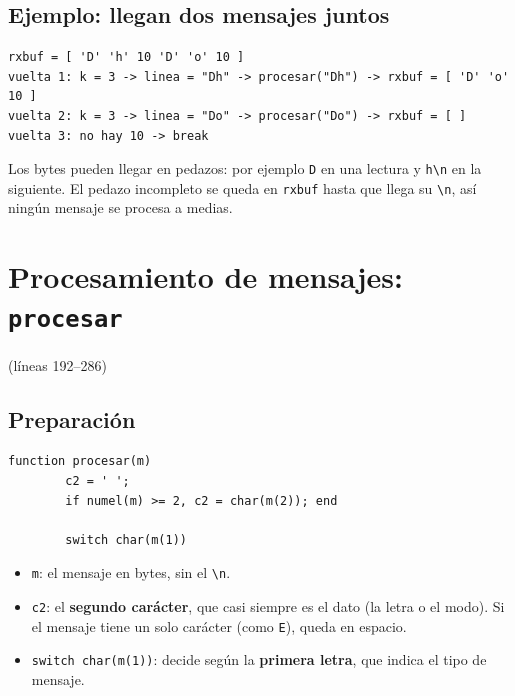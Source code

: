 \documentclass[11pt,a4paper]{article}
\newcommand{\linea}[1]{\textcolor{gris}{\small(líneas #1)}}
\newcommand{\cod}[1]{\texttt{#1}}
\begin{document}
\subsection*{Ejemplo: llegan dos mensajes juntos}
\begin{diagrama}
\begin{verbatim}
rxbuf = [ 'D' 'h' 10 'D' 'o' 10 ]
vuelta 1: k = 3 -> linea = "Dh" -> procesar("Dh") -> rxbuf = [ 'D' 'o' 10 ]
vuelta 2: k = 3 -> linea = "Do" -> procesar("Do") -> rxbuf = [ ]
vuelta 3: no hay 10 -> break
\end{verbatim}
\end{diagrama}

\begin{ojo}
Los bytes pueden llegar en pedazos: por ejemplo \cod{D} en una lectura y
\cod{h\textbackslash n} en la siguiente. El pedazo incompleto se queda en
\cod{rxbuf} hasta que llega su \cod{\textbackslash n}, así ningún mensaje se procesa
a medias.
\end{ojo}

\section{Procesamiento de mensajes: \texttt{procesar}}
\linea{192--286}

\subsection{Preparación}
\begin{lstlisting}[firstnumber=192]
    function procesar(m)
        c2 = ' ';
        if numel(m) >= 2, c2 = char(m(2)); end

        switch char(m(1))
\end{lstlisting}
\begin{itemize}
  \item \cod{m}: el mensaje en bytes, sin el \cod{\textbackslash n}.
  \item \cod{c2}: el \textbf{segundo carácter}, que casi siempre es el dato (la letra o
        el modo). Si el mensaje tiene un solo carácter (como \cod{E}), queda en espacio.
  \item \cod{switch char(m(1))}: decide según la \textbf{primera letra}, que indica el
        tipo de mensaje.
\end{itemize}
\end{document}
